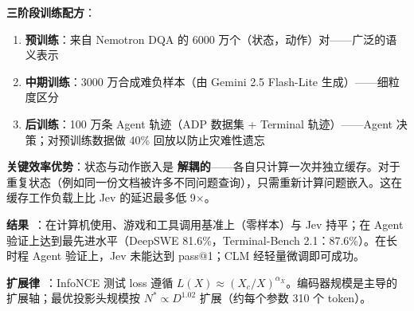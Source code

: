 \textbf{三阶段训练配方}：
\begin{enumerate}
  \item \textbf{预训练}：来自 Nemotron DQA 的 6000 万个（状态，动作）对——广泛的语义表示
  \item \textbf{中期训练}：3000 万合成难负样本（由 Gemini 2.5 Flash-Lite 生成）——细粒度区分
  \item \textbf{后训练}：100 万条 Agent 轨迹（ADP 数据集 + Terminal 轨迹）——Agent 决策；对预训练数据做 40\% 回放以防止灾难性遗忘
\end{enumerate}

\textbf{关键效率优势}：状态与动作嵌入是 \textbf{解耦的}——各自只计算一次并独立缓存。对于重复状态（例如同一份文档被许多不同问题查询），只需重新计算问题嵌入。这在缓存工作负载上比 Jev 的延迟最多低 9$\times$。

\textbf{结果}~\cite{kwok2026clm}：在计算机使用、游戏和工具调用基准上（零样本）与 Jev 持平；在 Agent 验证上达到最先进水平（DeepSWE 81.6\%，Terminal-Bench 2.1：87.6\%）。在长时程 Agent 验证上，Jev 未能达到 pass@1；CLM 经轻量微调即可成功。

\textbf{扩展律}~\cite{kwok2026clm}：InfoNCE 测试 loss 遵循 $L(X) \approx (X_c/X)^{\alpha_X}$。编码器规模是主导的扩展轴；最优投影头规模按 $N^* \propto D^{1.02}$ 扩展（约每个参数 310 个 token）。

